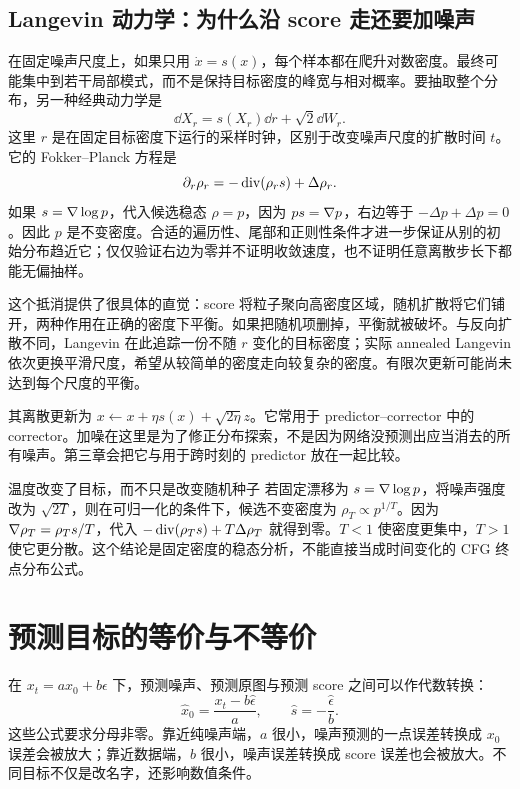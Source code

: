 \subsection{Langevin 动力学：为什么沿 score 走还要加噪声}
在固定噪声尺度上，如果只用 $\dot x=s(x)$，每个样本都在爬升对数密度。最终可能集中到若干局部模式，而不是保持目标密度的峰宽与相对概率。要抽取整个分布，另一种经典动力学是
\begin{equation}
 \dd X_r=s(X_r)\dd r+\sqrt2\dd W_r.
 \label{eq:langevin}
\end{equation}
这里 $r$ 是在固定目标密度下运行的采样时钟，区别于改变噪声尺度的扩散时间 $t$。它的 Fokker--Planck 方程是
\begin{equation}
 \partial_r\rho_r=-\operatorname{div}(\rho_rs)+\Delta\rho_r.
\end{equation}
如果 $s=\nabla\log p$，代入候选稳态 $\rho=p$，因为 $ps=\nabla p$，右边等于 $-\Delta p+\Delta p=0$。因此 $p$ 是不变密度。合适的遍历性、尾部和正则性条件才进一步保证从别的初始分布趋近它；仅仅验证右边为零并不证明收敛速度，也不证明任意离散步长下都能无偏抽样。

这个抵消提供了很具体的直觉：score 将粒子聚向高密度区域，随机扩散将它们铺开，两种作用在正确的密度下平衡。如果把随机项删掉，平衡就被破坏。与反向扩散不同，Langevin 在此追踪一份不随 $r$ 变化的目标密度；实际 annealed Langevin 依次更换平滑尺度，希望从较简单的密度走向较复杂的密度。有限次更新可能尚未达到每个尺度的平衡。

其离散更新为 $x\leftarrow x+\eta s(x)+\sqrt{2\eta}z$。它常用于 predictor--corrector 中的 corrector。加噪在这里是为了修正分布探索，不是因为网络没预测出应当消去的所有噪声。第三章会把它与用于跨时刻的 predictor 放在一起比较。

\begin{examplebox}{温度改变了目标，而不只是改变随机种子}
若固定漂移为 $s=\nabla\log p$，将噪声强度改为 $\sqrt{2T}$，则在可归一化的条件下，候选不变密度为 $\rho_T\propto p^{1/T}$。因为 $\nabla\rho_T=\rho_Ts/T$，代入 $-\operatorname{div}(\rho_Ts)+T\Delta\rho_T$ 就得到零。$T<1$ 使密度更集中，$T>1$ 使它更分散。这个结论是固定密度的稳态分析，不能直接当成时间变化的 CFG 终点分布公式。
\end{examplebox}

\section{预测目标的等价与不等价}\label{sec:parameterization}
在 $x_t=ax_0+b\epsilon$ 下，预测噪声、预测原图与预测 score 之间可以作代数转换：
\begin{equation}
 \widehat x_0=\frac{x_t-b\widehat\epsilon}{a},\qquad
 \widehat s=-\frac{\widehat\epsilon}{b}.
\end{equation}
这些公式要求分母非零。靠近纯噪声端，$a$ 很小，噪声预测的一点误差转换成 $x_0$ 误差会被放大；靠近数据端，$b$ 很小，噪声误差转换成 score 误差也会被放大。不同目标不仅是改名字，还影响数值条件。

